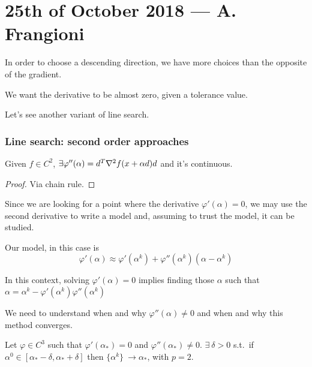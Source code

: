 \documentclass[ComputationalMathematics.tex]{subfiles}
\begin{document}
\section{25th of October 2018 --- A. Frangioni}

In order to choose a descending direction, we have more choices than the opposite of the gradient.

We want the derivative to be almost zero, given a tolerance value. 

Let's see another variant of line search.

\subsubsection{Line search: second order approaches}

\begin{theorem}
  Given $f \in C^2$,  $\exists \varphi''(\alpha) = {d}^{T} \nabla^{2} f(x + \alpha d ) d$ and it's continuous.
\end{theorem}
\begin{proof}
Via chain rule.
\end{proof}

Since we are looking for a point where the derivative $\varphi'(\alpha) = 0$, we may use the second derivative to write a model and, assuming to trust the model, it can be studied.

\begin{definition}
Our model, in this case is
  \[
    \varphi'(\alpha) \approx \varphi'(\alpha^k) + \varphi''(\alpha^k)(\alpha - \alpha^k)
  \]
\end{definition}

In this context, solving $\varphi'(\alpha) = 0$ implies finding those $\alpha$ such that $\alpha = \alpha^k - \varphi'(\alpha^k) \varphi''(\alpha^k)$ 


We need to understand when and why $\varphi''(\alpha) \ne 0$ and when and why this method converges.
\begin{theorem}
Let $\varphi \in C^{3}$ such that $\varphi'(\alpha_*) = 0$ and $\varphi''(\alpha_*) \neq 0$. $\exists~\delta > 0$ s.t.~if $\alpha^0 \in [\alpha_* - \delta, \alpha_* + \delta]$ then $\{\alpha^k \}~\to \alpha_*$, with $p = 2$.
\end{theorem}
\end{document}
